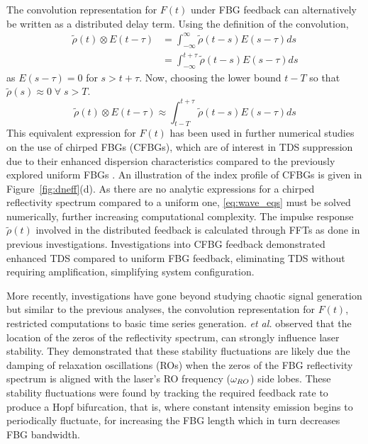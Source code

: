 %
\par
%
The convolution representation for $F(t)$ under FBG feedback can alternatively be written as a distributed delay term. Using the definition of the convolution,
%
\begin{align*}
    \tilde{\rho}(t) \otimes E(t-\tau)
    &= \int_{-\infty}^{\infty} \tilde{\rho}(t-s) E(s-\tau) ds \\
    &= \int_{-\infty}^{t+\tau} \tilde{\rho}(t-s) E(s-\tau) ds
\end{align*}
%
as $E(s-\tau)=0$ for $s>t+\tau$. Now, choosing the lower bound $t-T$ so that $\tilde{\rho}(s) \approx 0 \; \forall \; s>T$.
%
\begin{equation*}
    \tilde{\rho}(t) \otimes E(t-\tau) \approx \int_{t-T}^{t+\tau} \tilde{\rho}(t-s) E(s - \tau) ds
\end{equation*}
%
This equivalent expression for $F(t)$ has been used in further numerical studies on the use of chirped FBGs (CFBGs), 
which are of interest in TDS suppression due to their enhanced dispersion characteristics compared to the previously explored uniform FBGs \cite{wang2017time, wang2019key, wang2023critical, chao2020permutation}. 
An illustration of the index profile of CFBGs is given in Figure~\ref{fig:dneff}(d). 
As there are no analytic expressions for a chirped reflectivity spectrum compared to a uniform one, \eqref{eq:wave_eqs} must be solved numerically, further increasing computational complexity. 
The impulse response $\tilde{\rho}(t)$ involved in the distributed feedback is calculated through FFTs as done in previous investigations. 
Investigations into CFBG feedback demonstrated enhanced TDS compared to uniform FBG feedback, eliminating TDS without requiring amplification, simplifying system configuration.
%
\par
%
More recently, investigations have gone beyond studying chaotic signal generation but similar to the previous analyses, the convolution representation for $F(t)$, restricted computations to basic time series generation. 
\Skenderas \textit{et al.} observed that the location of the zeros of the reflectivity spectrum, can strongly influence laser stability. 
They demonstrated that these stability fluctuations are likely due the damping of relaxation oscillations (ROs) when the zeros of the FBG reflectivity spectrum is aligned with the laser's RO frequency ($\omega_{RO}$) side lobes. 
These stability fluctuations were found by tracking the required feedback rate to produce a Hopf bifurcation, that is, where constant intensity emission begins to periodically fluctuate, for increasing the FBG length which in turn decreases FBG bandwidth. 
